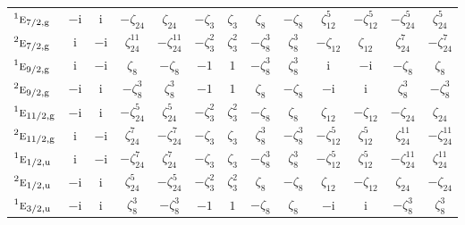 \documentclass[10pt,a4paper]{article}
\numberwithin{equation}{section}
\newcommand{\irr}[1]{\text{\normalfont\scshape #1}}
\newcommand{\conjpair}[1]{{}^{#1}}
\newcommand{\ptag}[1]{\mathrm{#1}}
\newcommand{\iunit}{\mathrm{i}}
\newcommand{\rootunity}[1]{\zeta_{#1}}
\begin{document}
{\begin{longtable}{@{}lcccccccccccc@{}}
$\conjpair{1}\irr{e}_{7/2,\ptag{g}}$ & $-\iunit{}$ & $\iunit{}$ & $-\rootunity{24}$ & $\rootunity{24}$ & $-\rootunity{3}$ & $\rootunity{3}$ & $\rootunity{8}$ & $-\rootunity{8}$ & $\rootunity{12}^{5}$ & $-\rootunity{12}^{5}$ & $-\rootunity{24}^{5}$ & $\rootunity{24}^{5}$\\
$\conjpair{2}\irr{e}_{7/2,\ptag{g}}$ & $\iunit{}$ & $-\iunit{}$ & $\rootunity{24}^{11}$ & $-\rootunity{24}^{11}$ & $-\rootunity{3}^{2}$ & $\rootunity{3}^{2}$ & $-\rootunity{8}^{3}$ & $\rootunity{8}^{3}$ & $-\rootunity{12}$ & $\rootunity{12}$ & $\rootunity{24}^{7}$ & $-\rootunity{24}^{7}$\\
$\conjpair{1}\irr{e}_{9/2,\ptag{g}}$ & $\iunit{}$ & $-\iunit{}$ & $\rootunity{8}$ & $-\rootunity{8}$ & $-1$ & $1$ & $-\rootunity{8}^{3}$ & $\rootunity{8}^{3}$ & $\iunit{}$ & $-\iunit{}$ & $-\rootunity{8}$ & $\rootunity{8}$\\
$\conjpair{2}\irr{e}_{9/2,\ptag{g}}$ & $-\iunit{}$ & $\iunit{}$ & $-\rootunity{8}^{3}$ & $\rootunity{8}^{3}$ & $-1$ & $1$ & $\rootunity{8}$ & $-\rootunity{8}$ & $-\iunit{}$ & $\iunit{}$ & $\rootunity{8}^{3}$ & $-\rootunity{8}^{3}$\\
$\conjpair{1}\irr{e}_{11/2,\ptag{g}}$ & $-\iunit{}$ & $\iunit{}$ & $-\rootunity{24}^{5}$ & $\rootunity{24}^{5}$ & $-\rootunity{3}^{2}$ & $\rootunity{3}^{2}$ & $-\rootunity{8}$ & $\rootunity{8}$ & $\rootunity{12}$ & $-\rootunity{12}$ & $-\rootunity{24}$ & $\rootunity{24}$\\
$\conjpair{2}\irr{e}_{11/2,\ptag{g}}$ & $\iunit{}$ & $-\iunit{}$ & $\rootunity{24}^{7}$ & $-\rootunity{24}^{7}$ & $-\rootunity{3}$ & $\rootunity{3}$ & $\rootunity{8}^{3}$ & $-\rootunity{8}^{3}$ & $-\rootunity{12}^{5}$ & $\rootunity{12}^{5}$ & $\rootunity{24}^{11}$ & $-\rootunity{24}^{11}$\\
$\conjpair{1}\irr{e}_{1/2,\ptag{u}}$ & $\iunit{}$ & $-\iunit{}$ & $-\rootunity{24}^{7}$ & $\rootunity{24}^{7}$ & $-\rootunity{3}$ & $\rootunity{3}$ & $-\rootunity{8}^{3}$ & $\rootunity{8}^{3}$ & $-\rootunity{12}^{5}$ & $\rootunity{12}^{5}$ & $-\rootunity{24}^{11}$ & $\rootunity{24}^{11}$\\
$\conjpair{2}\irr{e}_{1/2,\ptag{u}}$ & $-\iunit{}$ & $\iunit{}$ & $\rootunity{24}^{5}$ & $-\rootunity{24}^{5}$ & $-\rootunity{3}^{2}$ & $\rootunity{3}^{2}$ & $\rootunity{8}$ & $-\rootunity{8}$ & $\rootunity{12}$ & $-\rootunity{12}$ & $\rootunity{24}$ & $-\rootunity{24}$\\
$\conjpair{1}\irr{e}_{3/2,\ptag{u}}$ & $-\iunit{}$ & $\iunit{}$ & $\rootunity{8}^{3}$ & $-\rootunity{8}^{3}$ & $-1$ & $1$ & $-\rootunity{8}$ & $\rootunity{8}$ & $-\iunit{}$ & $\iunit{}$ & $-\rootunity{8}^{3}$ & $\rootunity{8}^{3}$\\

\end{longtable}}
\end{document}
